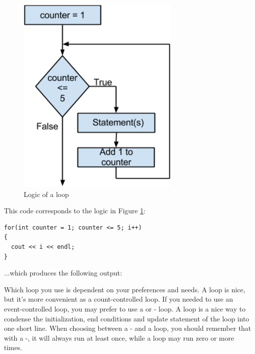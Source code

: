 \begin{figure}[tbh]
  \centering
  \includegraphics[width=0.7\textwidth]{diagrams/for_logic.pdf}
  \caption{Logic of a  loop} \label{fig-for-logic} 
\end{figure}

\noindent This code corresponds to the logic in Figure \ref{fig-for-logic}:

\noindent\begin{minipage}{\linewidth}\begin{lstlisting}
for(int counter = 1; counter <= 5; i++)
{
  cout << i << endl;
}
\end{lstlisting}\end{minipage}

\noindent ...which produces the following output:

\noindent{}

\noindent{}

\noindent{}

\noindent{}

\noindent{}


Which loop you use is dependent on your preferences and needs.
A  loop is nice, but it's more convenient as a count-controlled loop.
If you needed to use an event-controlled loop, you may prefer to use a  or - loop.
A  loop is a nice way to condense the initialization, end conditions and update statement of the loop into one short line.
When choosing between a - and a  loop, you should remember that with a -, it will always run at least once, while a  loop may run zero or more times.

